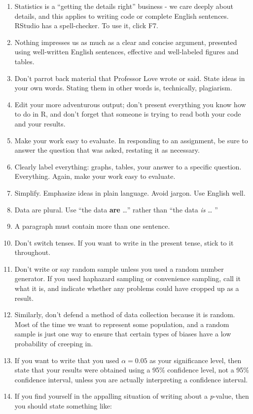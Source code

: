 \documentclass[
]{book}
\providecommand{\tightlist}{%
  \setlength{\itemsep}{0pt}\setlength{\parskip}{0pt}}
\begin{document}
\begin{enumerate}
\def\labelenumi{\arabic{enumi}.}
\tightlist
\item
  Statistics is a ``getting the details right'' business - we care deeply about details, and this applies to writing code or complete English sentences. RStudio has a spell-checker. To use it, click F7.
\item
  Nothing impresses us as much as a clear and concise argument, presented using well-written English sentences, effective and well-labeled figures and tables.
\item
  Don't parrot back material that Professor Love wrote or said. State ideas in your own words. Stating them in other words is, technically, plagiarism.
\item
  Edit your more adventurous output; don't present everything you know how to do in R, and don't forget that someone is trying to read both your code and your results.
\item
  Make your work easy to evaluate. In responding to an assignment, be sure to answer the question that was asked, restating it as necessary.
\item
  Clearly label everything: graphs, tables, your answer to a specific question. Everything. Again, make your work easy to evaluate.
\item
  Simplify. Emphasize ideas in plain language. Avoid jargon. Use English well.
\item
  Data are plural. Use ``the data \textbf{are} \ldots{}'' rather than ``the data \emph{is} \ldots{} ''
\item
  A paragraph must contain more than one sentence.\\
\item
  Don't switch tenses. If you want to write in the present tense, stick to it throughout.
\item
  Don't write or say random sample unless you used a random number generator. If you used haphazard sampling or convenience sampling, call it what it is, and indicate whether any problems could have cropped up as a result.
\item
  Similarly, don't defend a method of data collection because it is random. Most of the time we want to represent some population, and a random sample is just one way to ensure that certain types of biases have a low probability of creeping in.
\item
  If you want to write that you used \(\alpha = 0.05\) as your significance level, then state that your results were obtained using a 95\% confidence level, not a 95\% confidence interval, unless you are actually interpreting a confidence interval.\\
\item
  If you find yourself in the appalling situation of writing about a \emph{p}-value, then you should state something like:


\end{enumerate}
\end{document}
